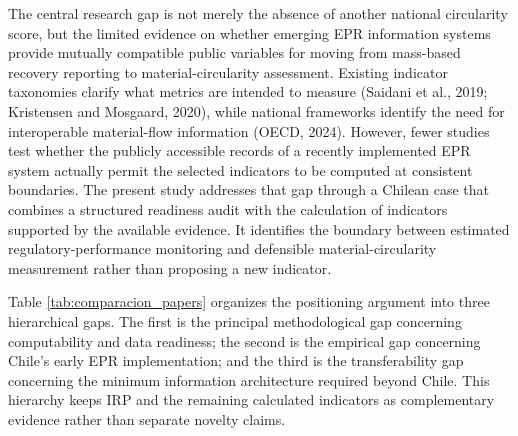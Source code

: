 \documentclass[review,10pt]{elsarticle}
\newcommand{\revpar}[1]{#1\par\medskip}
\begin{document}
\revpar{The central research gap is not merely the absence of another national circularity score, but the limited evidence on whether emerging EPR information systems provide mutually compatible public variables for moving from mass-based recovery reporting to material-circularity assessment. Existing indicator taxonomies clarify what metrics are intended to measure (Saidani et al., 2019; Kristensen and Mosgaard, 2020), while national frameworks identify the need for interoperable material-flow information (OECD, 2024). However, fewer studies test whether the publicly accessible records of a recently implemented EPR system actually permit the selected indicators to be computed at consistent boundaries. The present study addresses that gap through a Chilean case that combines a structured readiness audit with the calculation of indicators supported by the available evidence. It identifies the boundary between estimated regulatory-performance monitoring and defensible material-circularity measurement rather than proposing a new indicator.}

\revpar{Table \ref{tab:comparacion_papers} organizes the positioning argument into three hierarchical gaps. The first is the principal methodological gap concerning computability and data readiness; the second is the empirical gap concerning Chile's early EPR implementation; and the third is the transferability gap concerning the minimum information architecture required beyond Chile. This hierarchy keeps IRP and the remaining calculated indicators as complementary evidence rather than separate novelty claims.}
\end{document}
